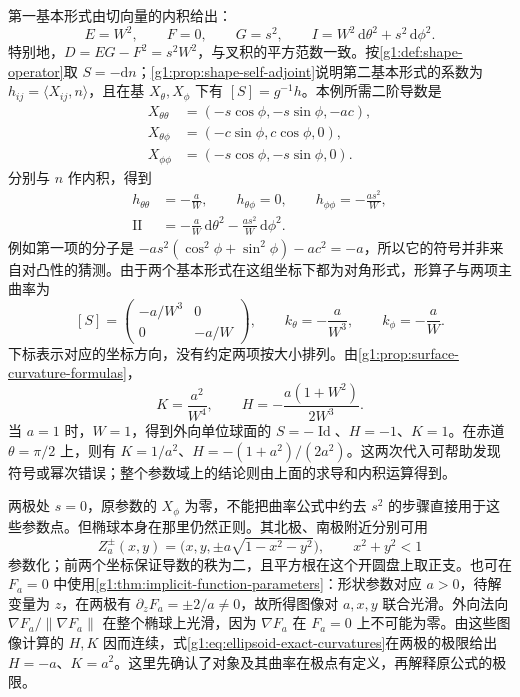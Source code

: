 \begin{example}
	第一基本形式由切向量的内积给出：
	\[
		E=W^2,\qquad F=0,\qquad G=s^2,\qquad
		I=W^2\,\mathrm d\theta^2+s^2\,\mathrm d\phi^2.
	\]
	特别地，\(D=EG-F^2=s^2W^2\)，与叉积的平方范数一致。按\cref{g1:def:shape-operator}取 \(S=-\mathrm dn\)；\cref{g1:prop:shape-self-adjoint}说明第二基本形式的系数为 \(h_{ij}=\langle X_{ij},n\rangle\)，且在基 \(X_\theta,X_\phi\) 下有 \([S]=g^{-1}h\)。本例所需二阶导数是
	\[
		\begin{aligned}
			X_{\theta\theta}&=(-s\cos\phi,-s\sin\phi,-ac),\\
			X_{\theta\phi}&=(-c\sin\phi,c\cos\phi,0),\\
			X_{\phi\phi}&=(-s\cos\phi,-s\sin\phi,0).
		\end{aligned}
	\]
	分别与 \(n\) 作内积，得到
	\[
		\begin{aligned}
			h_{\theta\theta}&=-\frac aW,\qquad h_{\theta\phi}=0,
			\qquad h_{\phi\phi}=-\frac{as^2}{W},\\
			\mathrm{II}&=-\frac aW\,\mathrm d\theta^2-\frac{as^2}{W}\,\mathrm d\phi^2.
		\end{aligned}
	\]
	例如第一项的分子是 \(-as^2(\cos^2\phi+\sin^2\phi)-ac^2=-a\)，所以它的符号并非来自对凸性的猜测。由于两个基本形式在这组坐标下都为对角形式，形算子与两项主曲率为
	\[
		[S]=\begin{pmatrix}-a/W^3&0\\0&-a/W\end{pmatrix},
		\qquad k_\theta=-\frac a{W^3},\qquad k_\phi=-\frac aW.
	\]
	下标表示对应的坐标方向，没有约定两项按大小排列。由\cref{g1:prop:surface-curvature-formulas}，
	\begin{equation}\label{g1:eq:ellipsoid-exact-curvatures}
		K=\frac{a^2}{W^4},\qquad
		H=-\frac{a(1+W^2)}{2W^3}.
	\end{equation}
	当 \(a=1\) 时，\(W=1\)，得到外向单位球面的 \(S=-\operatorname{Id}\)、\(H=-1\)、\(K=1\)。在赤道 \(\theta=\pi/2\) 上，则有 \(K=1/a^2\)、\(H=-(1+a^2)/(2a^2)\)。这两次代入可帮助发现符号或幂次错误；整个参数域上的结论则由上面的求导和内积运算得到。
\end{example}

两极处 \(s=0\)，原参数的 \(X_\phi\) 为零，不能把曲率公式中约去 \(s^2\) 的步骤直接用于这些参数点。但椭球本身在那里仍然正则。其北极、南极附近分别可用
\[
	Z_a^\pm(x,y)=\bigl(x,y,\pm a\sqrt{1-x^2-y^2}\bigr),
	\qquad x^2+y^2<1
\]
参数化；前两个坐标保证导数的秩为二，且平方根在这个开圆盘上取正支。也可在 \(F_a=0\) 中使用\cref{g1:thm:implicit-function-parameters}：形状参数对应 \(a>0\)，待解变量为 \(z\)，在两极有 \(\partial_zF_a=\pm2/a\ne0\)，故所得图像对 \(a,x,y\) 联合光滑。外向法向 \(\nabla F_a/\lVert\nabla F_a\rVert\) 在整个椭球上光滑，因为 \(\nabla F_a\) 在 \(F_a=0\) 上不可能为零。由这些图像计算的 \(H,K\) 因而连续，式\eqref{g1:eq:ellipsoid-exact-curvatures}在两极的极限给出 \(H=-a\)、\(K=a^2\)。这里先确认了对象及其曲率在极点有定义，再解释原公式的极限。

